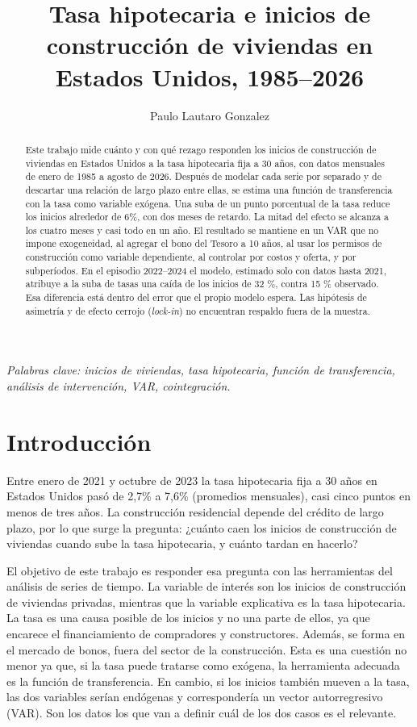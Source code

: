 \documentclass[11pt,a4paper]{article}
\title{\textbf{Tasa hipotecaria e inicios de construcci\'on de viviendas en Estados Unidos, 1985--2026}}
\author{Paulo Lautaro Gonzalez}
\date{}
\begin{document}
\maketitle
\begin{abstract}

Este trabajo mide cuánto y con qué rezago responden los inicios de construcción de viviendas en Estados Unidos a la tasa hipotecaria fija a 30 años, con datos mensuales de enero de 1985 a agosto de 2026. Después de modelar cada serie por separado y de descartar una relación de largo plazo entre ellas, se estima una función de transferencia con la tasa como variable exógena. Una suba de un punto porcentual de la tasa reduce los inicios alrededor de 6\%, con dos meses de retardo. La mitad del efecto se alcanza a los cuatro meses y casi todo en un año. El resultado se mantiene en un VAR que no impone exogeneidad, al agregar el bono del Tesoro a 10 años, al usar los permisos de construcción como variable dependiente, al controlar por costos y oferta, y por subperíodos. En el episodio 2022--2024 el modelo, estimado solo con datos hasta 2021, atribuye a la suba de tasas una caída de los inicios de 32 \%, contra 15 \% observado. Esa diferencia está dentro del error que el propio modelo espera. Las hipótesis de asimetría y de efecto cerrojo (\emph{lock-in}) no encuentran respaldo fuera de la muestra.

\end{abstract}

\noindent\emph{Palabras clave: inicios de viviendas, tasa hipotecaria, función de transferencia, análisis de intervención, VAR, cointegración.}

\section{Introducción}

Entre enero de 2021 y octubre de 2023 la tasa hipotecaria fija a 30 años en Estados Unidos pasó de 2,7\% a 7,6\% (promedios mensuales), casi cinco puntos en menos de tres años. La construcción residencial depende del crédito de largo plazo, por lo que surge la pregunta: ¿cuánto caen los inicios de construcción de viviendas cuando sube la tasa hipotecaria, y cuánto tardan en hacerlo?

El objetivo de este trabajo es responder esa pregunta con las herramientas del análisis de series de tiempo. La variable de interés son los inicios de construcción de viviendas privadas, mientras que la variable explicativa es la tasa hipotecaria. La tasa es una causa posible de los inicios y no una parte de ellos, ya que encarece el financiamiento de compradores y constructores. Además, se forma en el mercado de bonos, fuera del sector de la construcción. Esta es una cuestión no menor ya que, si la tasa puede tratarse como exógena, la herramienta adecuada es la función de transferencia. En cambio, si los inicios también mueven a la tasa, las dos variables serían endógenas y correspondería un vector autorregresivo (VAR). Son los datos los que van a definir cuál de los dos casos es el relevante.
\end{document}
